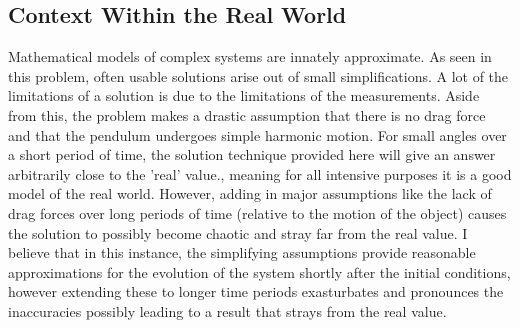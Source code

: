 \documentclass[11pt,a4paper]{article}
\begin{document}
\subsection{Context Within the Real World}

Mathematical models of complex systems are innately approximate.  As seen in this problem,  often usable solutions arise out of small simplifications.  A lot of the limitations of a solution is due to the limitations of the measurements.  Aside from this,  the problem makes a drastic assumption that there is no drag force and that the pendulum undergoes simple harmonic motion.  For small angles over a short period of time,  the solution technique provided here will give an answer arbitrarily close to the 'real' value., meaning for all intensive purposes it is a good model of the real world.  However,  adding in major assumptions like the lack of drag forces over long periods of time (relative to the motion of the object) causes the solution to possibly become chaotic and stray far from the real value.  I believe that in this instance,  the simplifying assumptions provide reasonable approximations for the evolution of the system shortly after the initial conditions,  however extending these to longer time periods exasturbates and pronounces the inaccuracies possibly leading to a result that strays from the real value.
\end{document}
